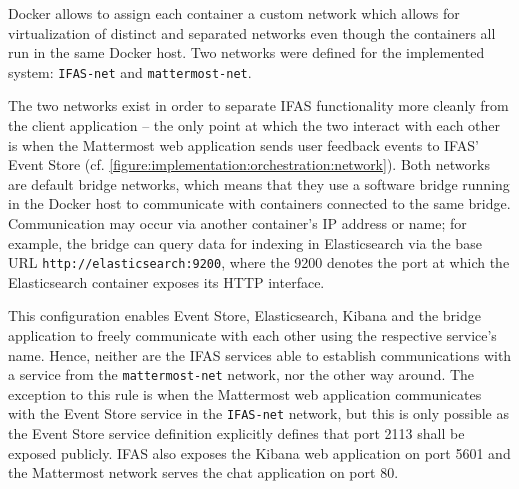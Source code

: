 Docker allows to assign each container a custom network which allows for virtualization of distinct and separated networks even though the containers all run in the same Docker host.
Two networks were defined for the implemented system: \texttt{IFAS-net} and \texttt{mattermost-net}.

The two networks exist in order to separate \ac{IFAS} functionality more cleanly from the client application -- the only point at which the two interact with each other is when the Mattermost web application sends user feedback events to \ac{IFAS}' Event Store (cf. \cref{figure:implementation:orchestration:network}).
Both networks are default bridge networks, which means that they use a software bridge running in the Docker host to communicate with containers connected to the same bridge.
Communication may occur via another container's IP address or name; for example, the bridge can query data for indexing in Elasticsearch via the base URL \texttt{http://elasticsearch:9200}, where the 9200 denotes the port at which the Elasticsearch container exposes its \ac{HTTP} interface.

This configuration enables Event Store, Elasticsearch, Kibana and the bridge application to freely communicate with each other using the respective service's name.
Hence, neither are the \ac{IFAS} services able to establish communications with a service from the \texttt{mattermost-net} network, nor the other way around.
The exception to this rule is when the Mattermost web application communicates with the Event Store service in the \texttt{IFAS-net} network, but this is only possible as the Event Store service definition explicitly defines that port 2113 shall be exposed publicly.
\ac{IFAS} also exposes the Kibana web application on port 5601 and the Mattermost network serves the chat application on port 80.

